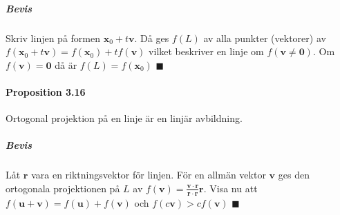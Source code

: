 \subparagraph{Bevis} Skriv linjen på formen $\bm{x}_{0}+t\bm{v}$.
Då ges $f(L)$ av alla punkter (vektorer) av $f(\bm{x}_{0}+t\bm{v})=f(\bm{x}_{0})+tf(\bm{v})$ vilket beskriver en linje om $f(\bm{v}\neq \bm{0})$.
Om $f(\bm{v})=\bm{0}$ då är $f(L)=f(\bm{x}_{0})$ $\blacksquare$

\paragraph{Proposition 3.16} Ortogonal projektion på en linje är en linjär avbildning.
\subparagraph{Bevis} Låt $\bm{r}$ vara en riktningsvektor för linjen.
För en allmän vektor $\bm{v}$ ges den ortogonala projektionen på $L$ av $f(\bm{v})=\frac{\bm{v}\cdot \bm{r}}{\bm{r}\cdot \bm{r}}\bm{r}$.
Visa nu att $f(\bm{u}+\bm{v})=f(\bm{u})+f(\bm{v})$ och $f(c\bm{v})>cf(\bm{v})$ $\blacksquare$

